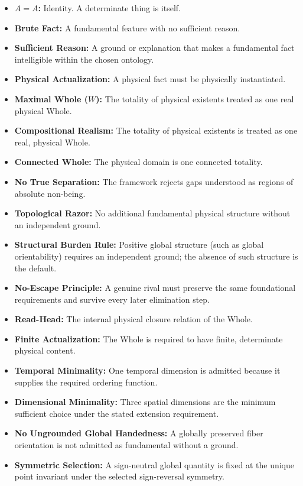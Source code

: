 \documentclass[11pt]{article}
\theoremstyle{canonstyle}
\begin{document}
\begin{itemize}
    \item \textbf{$A=A$:} Identity. A determinate thing is itself.
    \item \textbf{Brute Fact:} A fundamental feature with no sufficient reason.
    \item \textbf{Sufficient Reason:} A ground or explanation that makes a fundamental fact intelligible within the chosen ontology.
    \item \textbf{Physical Actualization:} A physical fact must be physically instantiated.
    \item \textbf{Maximal Whole ($W$):} The totality of physical existents treated as one real physical Whole.
    \item \textbf{Compositional Realism:} The totality of physical existents is treated as one real, physical Whole.
    \item \textbf{Connected Whole:} The physical domain is one connected totality.
    \item \textbf{No True Separation:} The framework rejects gaps understood as regions of absolute non-being.
    \item \textbf{Topological Razor:} No additional fundamental physical structure without an independent ground.
    \item \textbf{Structural Burden Rule:} Positive global structure (such as global orientability) requires an independent ground; the absence of such structure is the default.
    \item \textbf{No-Escape Principle:} A genuine rival must preserve the same foundational requirements and survive every later elimination step.
    \item \textbf{Read-Head:} The internal physical closure relation of the Whole.
    \item \textbf{Finite Actualization:} The Whole is required to have finite, determinate physical content.
    \item \textbf{Temporal Minimality:} One temporal dimension is admitted because it supplies the required ordering function.
    \item \textbf{Dimensional Minimality:} Three spatial dimensions are the minimum sufficient choice under the stated extension requirement.
    \item \textbf{No Ungrounded Global Handedness:} A globally preserved fiber orientation is not admitted as fundamental without a ground.
    \item \textbf{Symmetric Selection:} A sign-neutral global quantity is fixed at the unique point invariant under the selected sign-reversal symmetry.

\end{itemize}
\end{document}
